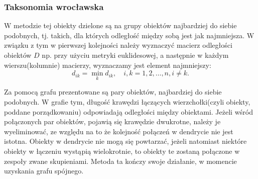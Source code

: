 \documentclass[12pt,a4paper]{report}
\begin{document}
\subsubsection{Taksonomia wrocławska}


W metodzie tej obiekty dzielone są na grupy obiektów najbardziej do siebie podobnych, tj. takich, dla których odległość między sobą jest jak najmniejsza. W związku z tym w pierwszej kolejności należy wyznaczyć macierz odległości obiektów $D$ np. przy użyciu metryki euklidesowej, a następnie w każdym wierszu(kolumnie) macierzy, wyznaczamy jest element najmniejszy: 
$$
d_{ik}= \min\limits_{k} {d_{ik}}, \quad i,k=1,2,\dots,n, i\neq k.
$$

Za pomocą grafu prezentowane są pary obiektów, najbardziej do siebie podobnych. W grafie tym, długość krawędzi łączących wierzchołki(czyli obiekty, poddane porządkowaniu) odpowiadają odległości między obiektami. Jeżeli wśród połączonych par obiektów, pojawią się krawędzie dwukrotne, należy je wyeliminować, ze względu na to że kolejność połączeń w dendrycie nie jest istotna. Obiekty w dendrycie nie mogą się powtarzać, jeżeli natomiast niektóre obiekty w łączeniu wystąpią wielokrotnie, to obiekty te zostaną połączone w zespoły zwane skupieniami. Metoda ta kończy swoje działanie, w momencie uzyskania grafu spójnego. 
\end{document}
